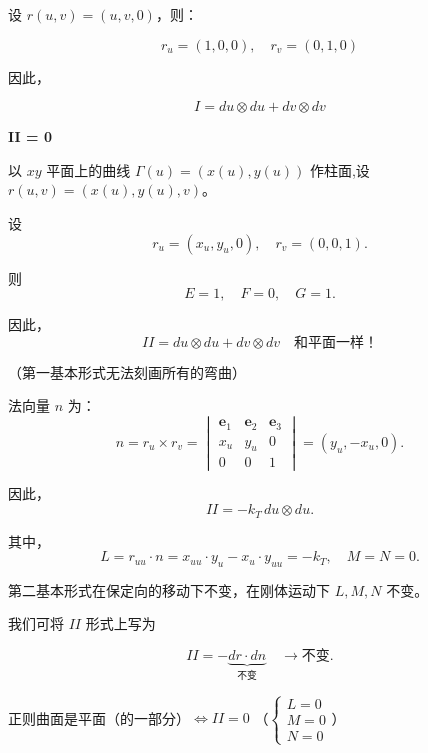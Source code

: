 \documentclass[lang=cn,10pt,thmcnt=section]{elegantbook}
\begin{document}
\begin{example}
    设 $r(u,v) = (u,v,0)$，则：

$$
r_u = (1,0,0), \quad r_v = (0,1,0)
$$

因此，

$$
I = du \otimes du + dv \otimes dv
$$

\textbf{II = 0} \quad {}
\end{example}

\begin{example}
    以 $xy$ 平面上的曲线 $\Gamma(u) = (x(u), y(u))$ 作柱面,设 $r(u,v) = (x(u), y(u), v)$。

    设
    $$
    r_u = (x_u, y_u, 0), \quad r_v = (0, 0, 1).
    $$
    
    则
    $$
    E = 1, \quad F = 0, \quad G = 1.
    $$
    
    因此，
    $$
    II = du \otimes du + dv \otimes dv \quad \text{和平面一样！}
    $$
    
    （第一基本形式无法刻画所有的弯曲）
    
    法向量 $n$ 为：
    $$
    n = r_u \times r_v = \begin{vmatrix}
    \mathbf{e}_1 & \mathbf{e}_2 & \mathbf{e}_3 \\
    x_u & y_u & 0 \\
    0 & 0 & 1
    \end{vmatrix} = (y_u, -x_u, 0).
    $$
    
    因此，
    $$
    II = -k_T \, du \otimes du.
    $$
    
    其中，
    $$
    L = r_{uu} \cdot n = x_{uu} \cdot y_u - x_u \cdot y_{uu} = -k_{T}, \quad M = N = 0.
    $$

\end{example}
\begin{proposition}
    第二基本形式在保定向的移动下不变，在刚体运动下 $L, M, N$ 不变。
\end{proposition}
\begin{remark}
    我们可将 $II$ 形式上写为

$$
II = -\underbrace{dr \cdot dn}_{\text{不变}} \quad \rightarrow \text{不变}.
$$
\end{remark}

\begin{proposition}
    正则曲面是平面（的一部分）$\Leftrightarrow II = 0$ （$\begin{cases} L = 0 \\ M = 0 \\ N = 0 \end{cases}$）
\end{proposition}
\end{document}
